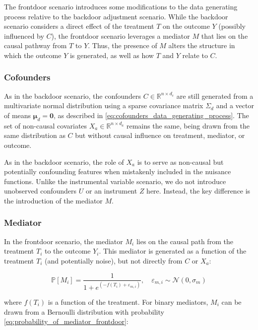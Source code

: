 \documentclass{article}
\numberwithin{equation}{section}
\begin{document}
The frontdoor scenario introduces some modifications to the data generating process relative to the backdoor adjustment scenario. While the backdoor scenario considers a direct effect of the treatment $T$ on the outcome $Y$ (possibly influenced by $C$), the frontdoor scenario leverages a mediator $M$ that lies on the causal pathway from $T$ to $Y$. Thus, the presence of $M$ alters the structure in which the outcome $Y$ is generated, as well as how $T$ and $Y$ relate to $C$.

\subsubsection{Cofounders}

As in the backdoor scenario, the confounders $C \in \mathbb{R}^{n \times d_c}$ are still generated from a multivariate normal distribution using a sparse covariance matrix $\Sigma_d$ and a vector of means $\boldsymbol{\mu}_d = \mathbf{0}$, as described in \eqref{eq:cofounders_data_generating_process}. The set of non-causal covariates $X_a \in \mathbb{R}^{n \times d_a}$ remains the same, being drawn from the same distribution as $C$ but without causal influence on treatment, mediator, or outcome.

As in the backdoor scenario, the role of $X_a$ is to serve as non-causal but potentially confounding features when mistakenly included in the nuisance functions. Unlike the instrumental variable scenario, we do not introduce unobserved confounders $U$ or an instrument $Z$ here. Instead, the key difference is the introduction of the mediator $M$.

\subsubsection{Mediator}

In the frontdoor scenario, the mediator $M_i$ lies on the causal path from the treatment $T_i$ to the outcome $Y_i$. This mediator is generated as a function of the treatment $T_i$ (and potentially noise), but not directly from $C$ or $X_a$:

\begin{equation}
    \mathbb{P}[M_i] = \frac{1}{1 + e^{(-f(T_i) + \varepsilon_{m, i})}}, 
    \quad \varepsilon_{m, i} \sim \mathcal{N}(0, \sigma_m)
    \label{eq:probability_of_mediator_frontdoor}
\end{equation}

where $f(T_i)$ is a function of the treatment. For binary mediators, $M_i$ can be drawn from a Bernoulli distribution with probability \eqref{eq:probability_of_mediator_frontdoor}:
\end{document}
